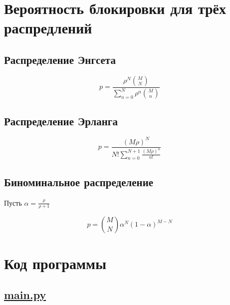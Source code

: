 \documentclass[12pt]{article}
\newcommand\purl[1]{\protect\url{#1}} %
\let\Oldsection\section
\renewcommand{\section}{\FloatBarrier\Oldsection}
\let\Oldsubsection\subsection
\renewcommand{\subsection}{\FloatBarrier\Oldsubsection}
\begin{document}
																																																							

\section{Вероятность блокировки для трёх распредлений}\label{sec:prob}


\subsection{Распределение Энгсета}\label{subsec:engset}

 \[
     p = \frac{\rho ^ N \binom{M}{N}}
     {\sum_{n=0}^{N} \rho ^ n \binom{M}{n}}
 \]

\subsection{Распределение Эрланга}\label{subsec:erlang}

\[
     p = \frac{(M \rho) ^ N}
     {N!\sum_{n=0}^{N + 1} \frac{(M \rho) ^ n}{n!}}
\]

\subsection{Биноминальное распределение}\label{subsec:binom}
Пусть $\alpha = \frac{\rho}{\rho + 1}$

\[
     p = \binom{M}{N} \alpha ^ N (1 - \alpha) ^ {M - N}
\]

\section{Код программы}

\subsection{\purl{main.py}}
\end{document}
